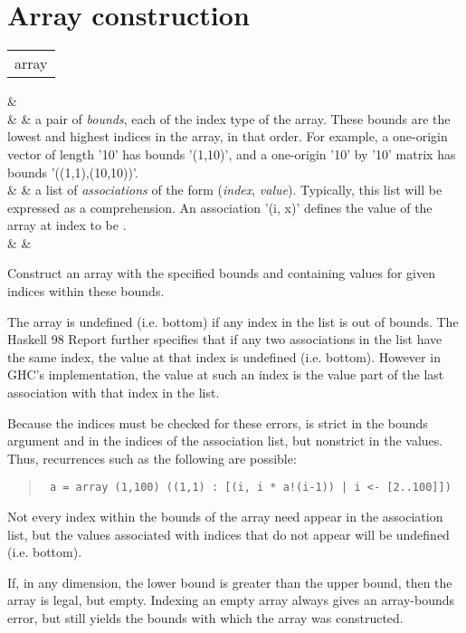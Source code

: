 \section{Array construction
}
\begin{haddockdesc}
\item[\begin{tabular}{@{}l}
array
\end{tabular}]\haddockbegindoc
\haddockbeginargs
\haddockdecltt{::} &  \\
                     \haddockdecltt{=>} &  & a pair of \emph{bounds}, each of the index type
 of the array.  These bounds are the lowest and
 highest indices in the array, in that order.
 For example, a one-origin vector of length
 '10' has bounds '(1,10)', and a one-origin '10'
 by '10' matrix has bounds '((1,1),(10,10))'.
 \\
                                                                   \haddockdecltt{->} & \haddockdecltt{[(i, e)]} & a list of \emph{associations} of the form
 (\emph{index}, \emph{value}).  Typically, this list will
 be expressed as a comprehension.  An
 association '(i, x)' defines the value of
 the array at index  to be .
 \\
                                                                                                                   \haddockdecltt{->} &  & \\
\haddockendargs\par
Construct an array with the specified bounds and containing values
 for given indices within these bounds.
\par
The array is undefined (i.e. bottom) if any index in the list is
 out of bounds.  The Haskell 98 Report further specifies that if any
 two associations in the list have the same index, the value at that
 index is undefined (i.e. bottom).  However in GHC's implementation,
 the value at such an index is the value part of the last association
 with that index in the list.
\par
Because the indices must be checked for these errors,  is
 strict in the bounds argument and in the indices of the association
 list, but nonstrict in the values.  Thus, recurrences such as the
 following are possible:
\par
\begin{quote}
{\haddockverb\begin{verbatim}
 a = array (1,100) ((1,1) : [(i, i * a!(i-1)) | i <- [2..100]])
\end{verbatim}}
\end{quote}
Not every index within the bounds of the array need appear in the
 association list, but the values associated with indices that do not
 appear will be undefined (i.e. bottom).
\par
If, in any dimension, the lower bound is greater than the upper bound,
 then the array is legal, but empty.  Indexing an empty array always
 gives an array-bounds error, but  still yields the bounds
 with which the array was constructed.
\par

\end{haddockdesc}

